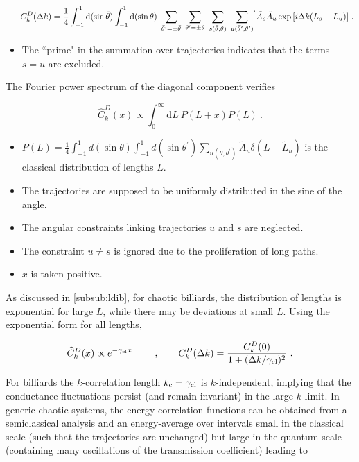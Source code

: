 \documentclass[a4paper,10pt]{article}
\newcommand{\dif}{\mathrm{d}}
\newcommand{\nin}{\noindent}
\def\btheta{\bar {\theta}}
\newcommand{\be}{\begin{equation}}
\newcommand{\ee}{\end{equation}}
\newcommand{\dlk}{\Delta k}
\newcommand{\gcl}{\gamma_{\rm cl}}
\newcommand{\uttp}{u(\theta,\theta^{\prime} )}
\begin{document}
\be
\hspace{0.6cm} C_k^D(\dlk) = \frac{1}{4}
\int_{-1}^{1} \dif(\sin\btheta)\int_{-1}^{1} \dif(\sin\theta)
\ \sum_{\btheta^{\prime}=\pm \btheta} \ \sum_{\theta^{\prime}=\pm \theta}
\ \sum_{s(\btheta,\theta)} \ 
\sum_{u(\btheta^{\prime},\theta^{\prime})}\!{^{^{\prime}}} 
\tilde{A}_s \tilde{A}_u
\exp{\left[i \dlk (L_s - L_u)\right]} \ .
\label{eq:Cdsc2}
\ee

\begin{itemize}

\item The ``prime" in the summation over trajectories indicates that the terms $s\!=\!u$ are excluded.

\end{itemize}

\nin The Fourier power spectrum of the diagonal component verifies

\be
\widehat{C}_k^D (x) \propto \int_{0}^{\infty}\! \dif L \:P(L+x) P(L) \ .
\label{eq:Chatchaos1}
\ee

\begin{itemize}

\item $P(L) = \frac{1}{4}
\int_{-1}^{1} d(\sin\theta)\int_{-1}^{1} d(\sin\theta^{\prime})
\sum_{\uttp}  \tilde{A}_u \delta(L - \tilde{L}_u)$ is the classical distribution of lengths $L$.

\item The trajectories are supposed to be uniformly distributed in the sine of the angle.

\item The angular constraints linking trajectories $u$ and $s$ are neglected.

\item The constraint $u \neq s$ is ignored due to the 
proliferation of long paths.

\item $x$ is taken positive.

\end{itemize}

\nin As discussed in \ref{subsub:ldib}, for chaotic billiards,
the distribution of lengths is exponential for large $L$, while there may be deviations at small $L$. Using the exponential form for all lengths, 

\be
\widehat{C}_k^D (x) \propto e^{-\gcl x } \qquad \ , \qquad
C_k^D (\dlk) = \frac{C_k^D(0)}{1 + (\dlk/ \gcl)^2} \ .
\label{eq:Chatchaos2}
\ee

\nin For billiards the $k$-correlation length $k_{\rm c}=\gcl$ is $k$-independent, implying that the conductance fluctuations persist (and remain invariant) in the large-$k$ limit. In generic chaotic systems, the energy-correlation functions can be obtained from a semiclassical analysis and an energy-average over intervals small in the classical scale (such that the trajectories are unchanged) but large in the quantum scale (containing many oscillations of the transmission coefficient) leading to \cite{Blu88} 
\end{document}
